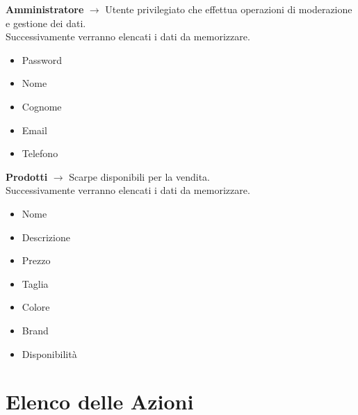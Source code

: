 \documentclass[a4paper,12pt]{report}
\begin{document}
	\textbf{Amministratore} $\longrightarrow$ Utente privilegiato che effettua operazioni di moderazione e gestione dei dati.\\
	Successivamente verranno elencati i dati da memorizzare.
	\begin{itemize}
		\item Password
		\item Nome
		\item Cognome
		\item Email
		\item Telefono
	\end{itemize}
	
	\textbf{Prodotti} $\longrightarrow$ Scarpe disponibili per la vendita.\\
	Successivamente verranno elencati i dati da memorizzare.
	\begin{itemize}
		\item Nome
		\item Descrizione
		\item Prezzo
		\item Taglia
		\item Colore
		\item Brand
		\item Disponibilità
	\end{itemize}
	
	\section{Elenco delle Azioni}
\end{document}

